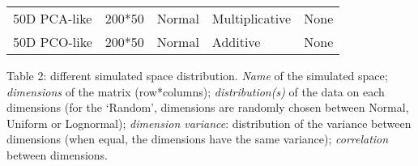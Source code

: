 \documentclass[]{article}
\begin{document}
\begin{longtable}[]{@{}lllll@{}}
\begin{minipage}[t]{0.12\columnwidth}
50D PCA-like\strut
\end{minipage} & \begin{minipage}[t]{0.08\columnwidth}\raggedright\strut
200*50\strut
\end{minipage} & \begin{minipage}[t]{0.31\columnwidth}\raggedright\strut
Normal\strut
\end{minipage} & \begin{minipage}[t]{0.21\columnwidth}\raggedright\strut
Multiplicative\strut
\end{minipage} & \begin{minipage}[t]{0.13\columnwidth}\raggedright\strut
None\strut
\end{minipage}\tabularnewline
\begin{minipage}[t]{0.12\columnwidth}\raggedright\strut
50D PCO-like\strut
\end{minipage} & \begin{minipage}[t]{0.08\columnwidth}\raggedright\strut
200*50\strut
\end{minipage} & \begin{minipage}[t]{0.31\columnwidth}\raggedright\strut
Normal\strut
\end{minipage} & \begin{minipage}[t]{0.21\columnwidth}\raggedright\strut
Additive\strut
\end{minipage} & \begin{minipage}[t]{0.13\columnwidth}\raggedright\strut
None\strut
\end{minipage}\tabularnewline
\bottomrule
\end{longtable}

Table 2: different simulated space distribution. \emph{Name} of the
simulated space; \emph{dimensions} of the matrix (row*columns);
\emph{distribution(s)} of the data on each dimensions (for the `Random',
dimensions are randomly chosen between Normal, Uniform or Lognormal);
\emph{dimension variance}: distribution of the variance between
dimensions (when equal, the dimensions have the same variance);
\emph{correlation} between dimensions.

\renewcommand\baselinestretch{1.6}\selectfont
\end{document}
